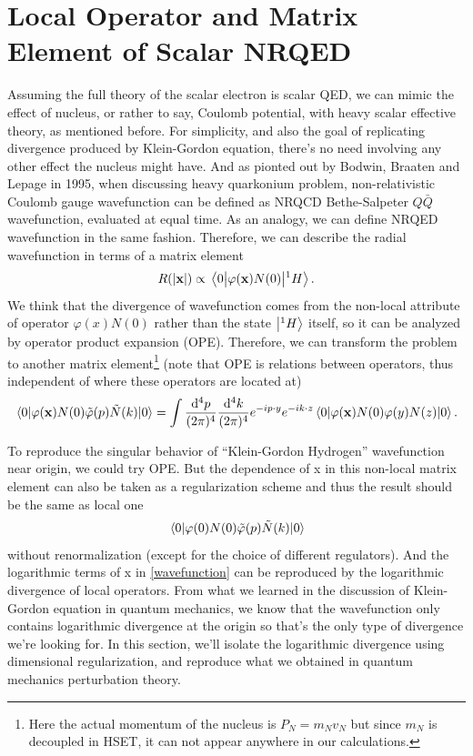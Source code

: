 \documentclass[aps,prd,preprint,showkeys,10pt]{revtex4-1}
\begin{document}
\section{Local Operator and Matrix Element of Scalar NRQED\label{sec:lo}}
Assuming the full theory of the scalar electron is scalar QED, we can mimic the effect of nucleus, or rather to say, Coulomb potential, with heavy scalar effective theory, as mentioned before. For simplicity, and also the goal of replicating divergence produced by Klein-Gordon equation, there's no need involving any other effect the nucleus might have. And as pionted out by Bodwin, Braaten and Lepage in 1995\cite{Bodwin1995}, when discussing heavy quarkonium problem, non-relativistic Coulomb gauge wavefunction can be defined as NRQCD Bethe-Salpeter $Q\bar Q$ wavefunction, evaluated at equal time. As an analogy, we can define NRQED wavefunction in the same fashion. Therefore, we can describe the radial wavefunction in terms of a matrix element
\begin{align}
	R(\abs{\vb{x}})\propto\mel{0}{\varphi(\vb{x})N(0)}{{}^1H}.\label{wavefunction}
\end{align}
We think that the divergence of wavefunction comes from the non-local attribute of operator $\varphi(x)N(0)$ rather than the state $\ket{{}^1H}$ itself, so it can be analyzed by operator product expansion (OPE)\cite{Lepage:1997cs}. Therefore, we can transform the problem to another matrix element\footnote{Here the actual momentum of the nucleus is $P_N=m_Nv_N$ but since $m_N$ is decoupled in HSET, it can not appear anywhere in our calculations. } (note that OPE is relations between operators, thus independent of where these operators are located at)
\begin{align}
	\mel{0}{\varphi(\vb{x})N(0)\tilde\varphi(p)\tilde N(k)}{0}=\int\frac{\dd^4 p}{(2\pi)^4}\frac{\dd^4 k}{(2\pi)^4}e^{-ip\cdot y}e^{-ik\cdot z}\mel{0}{\varphi(\vb{x})N(0)\varphi(y)N(z)}{0}.\label{NLME}
\end{align}

To reproduce the singular behavior of ``Klein-Gordon Hydrogen'' wavefunction near origin, we could try OPE. But the dependence of x in this non-local matrix element can also be taken as a regularization scheme and thus the result should be the same as local one
$$\mel{0}{\varphi(0)N(0)\tilde\varphi(p)\tilde N(k)}{0}$$
without renormalization (except for the choice of different regulators). And the logarithmic terms of x in \eqref{wavefunction} can be reproduced by the logarithmic divergence of local operators. From what we learned in the discussion of Klein-Gordon equation in quantum mechanics, we know that the wavefunction only contains logarithmic divergence at the origin so that's the only type of divergence we're looking for. In this section, we'll isolate the logarithmic divergence using dimensional regularization, and reproduce what we obtained in quantum mechanics perturbation theory.
\end{document}
